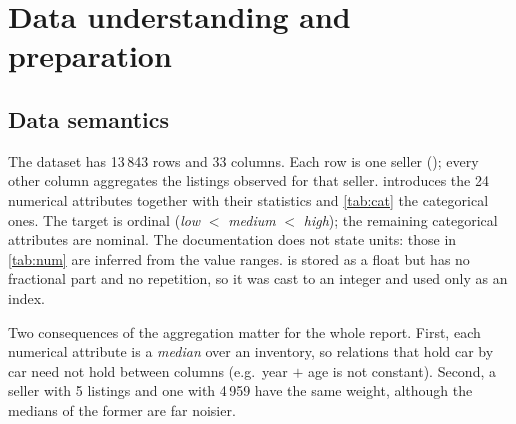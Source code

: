 \section{Data understanding and preparation}\label{sec:m1}

\subsection{Data semantics}\label{sec:sem}
The dataset has 13\,843 rows and 33 columns. Each row is one seller (); every other column aggregates the listings observed for that seller.  introduces the 24 numerical attributes together with their statistics and \cref{tab:cat} the categorical ones. The target  is ordinal (\emph{low} $<$ \emph{medium} $<$ \emph{high}); the remaining categorical attributes are nominal. The documentation does not state units: those in \cref{tab:num} are inferred from the value ranges.  is stored as a float but has no fractional part and no repetition, so it was cast to an integer and used only as an index.

Two consequences of the aggregation matter for the whole report. First, each numerical attribute is a \emph{median} over an inventory, so relations that hold car by car need not hold between columns (e.g.\ year $+$ age is not constant). Second, a seller with 5 listings and one with 4\,959 have the same weight, although the medians of the former are far noisier.

\begin{table}[t]
\centering
\caption{Numerical attributes after cleaning: semantics, statistics, association with the target ($\eps^2$, Kruskal--Wallis effect size) and role in modelling (\emph{log1p}/\emph{raw}: scale used by distance-based and Gaussian methods; \emph{dropped}: eliminated in \cref{sec:corr}). Suffix  omitted.}\label{tab:num}
\end{table}

